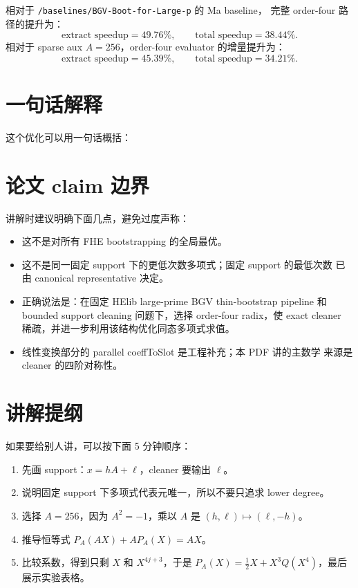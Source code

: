 \documentclass[11pt,a4paper]{ctexart}
\theoremstyle{definition}
\begin{document}
相对于 \texttt{/baselines/BGV-Boot-for-Large-p} 的 Ma baseline，
完整 order-four 路径的提升为：
\[
  \text{extract speedup}=49.76\%,\qquad
  \text{total speedup}=38.44\%.
\]
相对于 sparse aux $A=256$，order-four evaluator 的增量提升为：
\[
  \text{extract speedup}=45.39\%,\qquad
  \text{total speedup}=34.21\%.
\]

\section{一句话解释}

这个优化可以用一句话概括：

\begin{center}
\end{center}

\section{论文 claim 边界}

讲解时建议明确下面几点，避免过度声称：

\begin{itemize}
  \item 这不是对所有 FHE bootstrapping 的全局最优。
  \item 这不是同一固定 support 下的更低次数多项式；固定 support 的最低次数
  已由 canonical representative 决定。
  \item 正确说法是：在固定 HElib large-prime BGV thin-bootstrap pipeline
  和 bounded support cleaning 问题下，选择 order-four radix，使 exact
  cleaner 稀疏，并进一步利用该结构优化同态多项式求值。
  \item 线性变换部分的 parallel coeffToSlot 是工程补充；本 PDF 讲的主数学
  来源是 cleaner 的四阶对称性。
\end{itemize}

\section{讲解提纲}

如果要给别人讲，可以按下面 5 分钟顺序：

\begin{enumerate}
  \item 先画 support：$x=hA+\ell$，cleaner 要输出 $\ell$。
  \item 说明固定 support 下多项式代表元唯一，所以不要只追求 lower degree。
  \item 选择 $A=256$，因为 $A^2=-1$，乘以 $A$ 是 $(h,\ell)\mapsto(\ell,-h)$。
  \item 推导恒等式 $P_A(AX)+AP_A(X)=AX$。
  \item 比较系数，得到只剩 $X$ 和 $X^{4j+3}$，于是
  $P_A(X)=\frac12X+X^3Q(X^4)$，最后展示实验表格。
\end{enumerate}
\end{document}
